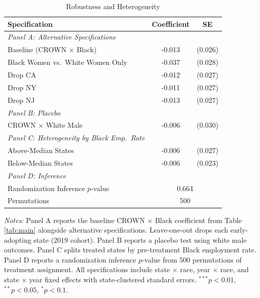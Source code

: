 \begin{table}[htbp]
\centering
\caption{Robustness and Heterogeneity}
\label{tab:robust}
\small
\begin{tabular}{lcc}
\toprule
Specification & Coefficient & SE \\
\midrule
\textit{Panel A: Alternative Specifications} & & \\
\quad Baseline (CROWN $\times$ Black) & -0.013 & (0.026) \\
\quad Black Women vs.\ White Women Only & -0.037 & (0.028) \\
\quad Drop CA & -0.012 & (0.027) \\
\quad Drop NY & -0.011 & (0.027) \\
\quad Drop NJ & -0.013 & (0.027) \\
\midrule
\textit{Panel B: Placebo} & & \\
\quad CROWN $\times$ White Male & -0.006 & (0.030) \\
\midrule
\textit{Panel C: Heterogeneity by Black Emp.\ Rate} & & \\
\quad Above-Median States & -0.006 & (0.027) \\
\quad Below-Median States & -0.006 & (0.023) \\
\midrule
\textit{Panel D: Inference} & & \\
\quad Randomization Inference $p$-value & \multicolumn{2}{c}{0.664} \\
\quad Permutations & \multicolumn{2}{c}{500} \\
\bottomrule
\end{tabular}
\begin{tablenotes}
\item \textit{Notes:} Panel A reports the baseline CROWN $\times$ Black coefficient from Table \ref{tab:main} alongside alternative specifications. Leave-one-out drops each early-adopting state (2019 cohort). Panel B reports a placebo test using white male outcomes. Panel C splits treated states by pre-treatment Black employment rate. Panel D reports a randomization inference $p$-value from 500 permutations of treatment assignment. All specifications include state $\times$ race, year $\times$ race, and state $\times$ year fixed effects with state-clustered standard errors. $^{***}p<0.01$, $^{**}p<0.05$, $^{*}p<0.1$.
\end{tablenotes}
\end{table}
